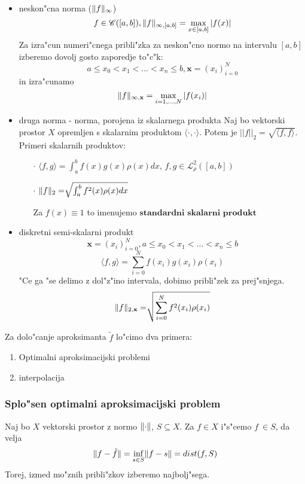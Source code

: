 \documentclass[a4paper,12pt]{article}
\DeclarePairedDelimiter\norm{\lVert}{\rVert}
\newcommand{\innerproduct}[2]{\langle #1, #2 \rangle}
\theoremstyle{definition}
\theoremstyle{remark}
\begin{document}
\begin{itemize}
    \item neskon"cna norma ($\norm{f}_{\infty}$)
    \[f \in \mathscr{C}([a, b]), \norm{f}_{\infty, [a, b]} = \max_{x \in [a, b]} |f(x)|\]
    Za izra"cun numeri"cnega pribli"zka za neskon"cno normo na intervalu $[a, b]$ izberemo dovolj gosto zaporedje to"c"k:
    \[a \leq x_0 < x_1 < ... < x_n \leq b, \textbf{x} = (x_i)_{i=0}^N\]
    in izra"cunamo
    \[\norm{f}_{\infty, \textbf{x}} = \max_{i = 1, \dots, N} |f(x_i)|\]
    \item druga norma - norma, porojena iz skalarnega produkta
    Naj bo vektorski prostor $X$ opremljen s skalarnim produktom $\innerproduct{\cdot}{\cdot}$. Potem je $||f||_2 = \sqrt{\innerproduct{f}{f}}$.
    Primeri skalarnih produktov:
    \begin{enumerate}
        \item[$\cdot$] $\innerproduct{f}{g} = \int_{a}^{b} f(x) g(x) \rho(x) dx$, $f, g \in \mathscr{L}_{\rho}^2 ([a, b])$
        \item[$\cdot$] $\norm{f}_2 = \sqrt[]{\int_{a}^{b} f^2(x)\rho(x)dx }$
        
        Za $f(x) \equiv 1$ to imenujemo $\textbf{standardni skalarni produkt}$
    \end{enumerate}
    \item diskretni semi-skalarni produkt
    \[\textbf{x} = (x_i)_{i=0}^N, a \leq x_0 < x_1 < ... < x_n \leq b\]
    \[\innerproduct{f}{g} = \sum_{i = 0}^{N} f(x_i) g(x_i) \rho(x_i)\]
    "Ce ga "se delimo z dol"z"ino intervala, dobimo pribli"zek za prej"snjega.
    \[\norm{f}_{2, \textbf{x}} = \sqrt[]{\sum_{i = 0}^{N} f^2(x_i)\rho(x_i)}\]
\end{itemize}


Za dolo"canje aproksimanta $\tilde{f}$ lo"cimo dva primera:
\begin{enumerate}
    \item Optimalni aproksimacijski problemi
    \item interpolacija
\end{enumerate}

\subsubsection{Splo"sen optimalni aproksimacijski problem}
Naj bo $X$ vektorski prostor z normo $\norm{\cdot}$, $S \subseteq X$. Za $f \in X$ i"s"cemo $f~ \in S$, da velja
\begin{equation}
    \norm{f - \tilde{f}} = \inf_{s \in S} \norm{f - s} = dist(f, S)
\end{equation}
Torej, izmed mo"znih pribli"zkov izberemo najbolj"sega.
\end{document}
